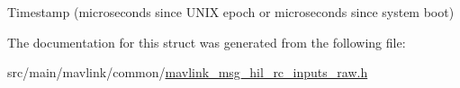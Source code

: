 Timestamp (microseconds since U\+N\+I\+X epoch or microseconds since system boot) 



The documentation for this struct was generated from the following file\+:\begin{DoxyCompactItemize}
\item 
src/main/mavlink/common/\hyperlink{mavlink__msg__hil__rc__inputs__raw_8h}{mavlink\+\_\+msg\+\_\+hil\+\_\+rc\+\_\+inputs\+\_\+raw.\+h}\end{DoxyCompactItemize}
